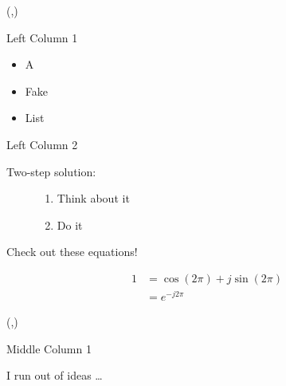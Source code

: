 \documentclass[final]{beamer}
\begin{document}
\begin{frame}[fragile]{}
\begin{textblock}{\lcolwidth}(\firstcolpos,\vstartCols)

\begin{paddedBlock}{Left Column 1}

\begin{itemize}
\item A
\item Fake
\item List
\end{itemize}


\end{paddedBlock}


\begin{paddedBlock}{Left Column 2}

\begin{description}
\item[Two-step solution:]\hfill
    \begin{enumerate}
    \item Think about it
    \item Do it
    \end{enumerate}
\end{description}

\vspace{1cm}

\alert{Check out these equations!}

\begin{align}
1 &= \cos(2\pi) + j\sin(2\pi) \\
  &= e^{-j2\pi}
\end{align}

\end{paddedBlock}


\end{textblock}



\begin{textblock}{\mcolwidth}(\secondcolpos,\vstartCols)

\begin{paddedBlock}{Middle Column 1}

I run out of ideas \ldots

\end{paddedBlock}


\end{textblock}
\end{frame}
\end{document}
